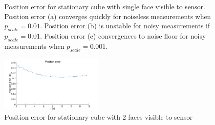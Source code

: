 \begin{figure}
{\begin{minipage}[b]{0.45\columnwidth}
 	\end{minipage}}
 	\caption{Position error for stationary cube with single face visible to sensor. Position error (a) converges quickly for noiseless measurements when $p_{scale}=0.01$. Position error (b) is unstable for noisy measurements if $p_{scale}=0.01$. Position error (c) convergences to noise floor for noisy measurements when $p_{scale}=0.001$.}
 	\label{fig:position_update_1F}
\end{figure}

\begin{figure}
\centering
	\includegraphics[width=0.45\textwidth,trim = 0mm 0mm 0mm 0mm,clip]{./Figures/position_error_4_stationary_2F}\vspace*{0ex}
	\caption{Position error for stationary cube with 2 faces visible to sensor}
  	\label{fig:position_error_4_stationary_2F}
\end{figure}

